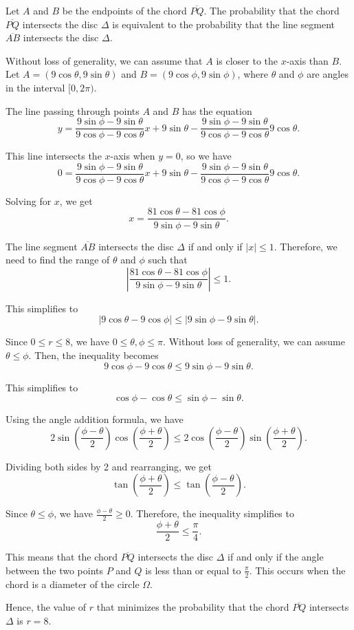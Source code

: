 Let $A$ and $B$ be the endpoints of the chord $\overline{PQ}$. The probability that the chord $\overline{PQ}$ intersects the disc $\Delta$ is equivalent to the probability that the line segment $\overline{AB}$ intersects the disc $\Delta$. 

Without loss of generality, we can assume that $A$ is closer to the $x$-axis than $B$. Let $A = (9\cos\theta, 9\sin\theta)$ and $B = (9\cos\phi, 9\sin\phi)$, where $\theta$ and $\phi$ are angles in the interval $[0, 2\pi)$.

The line passing through points $A$ and $B$ has the equation
$$y = \frac{9\sin\phi - 9\sin\theta}{9\cos\phi - 9\cos\theta}x + 9\sin\theta - \frac{9\sin\phi - 9\sin\theta}{9\cos\phi - 9\cos\theta}9\cos\theta.$$

This line intersects the $x$-axis when $y = 0$, so we have
$$0 = \frac{9\sin\phi - 9\sin\theta}{9\cos\phi - 9\cos\theta}x + 9\sin\theta - \frac{9\sin\phi - 9\sin\theta}{9\cos\phi - 9\cos\theta}9\cos\theta.$$

Solving for $x$, we get
$$x = \frac{81\cos\theta - 81\cos\phi}{9\sin\phi - 9\sin\theta}.$$

The line segment $\overline{AB}$ intersects the disc $\Delta$ if and only if $|x| \leq 1$. Therefore, we need to find the range of $\theta$ and $\phi$ such that
$$\left|\frac{81\cos\theta - 81\cos\phi}{9\sin\phi - 9\sin\theta}\right| \leq 1.$$

This simplifies to
$$|9\cos\theta - 9\cos\phi| \leq |9\sin\phi - 9\sin\theta|.$$

Since $0 \leq r \leq 8$, we have $0 \leq \theta, \phi \leq \pi$. Without loss of generality, we can assume $\theta \leq \phi$. Then, the inequality becomes
$$9\cos\phi - 9\cos\theta \leq 9\sin\phi - 9\sin\theta.$$

This simplifies to
$$\cos\phi - \cos\theta \leq \sin\phi - \sin\theta.$$

Using the angle addition formula, we have
$$2\sin\left(\frac{\phi - \theta}{2}\right)\cos\left(\frac{\phi + \theta}{2}\right) \leq 2\cos\left(\frac{\phi - \theta}{2}\right)\sin\left(\frac{\phi + \theta}{2}\right).$$

Dividing both sides by 2 and rearranging, we get
$$\tan\left(\frac{\phi + \theta}{2}\right) \leq \tan\left(\frac{\phi - \theta}{2}\right).$$

Since $\theta \leq \phi$, we have $\frac{\phi - \theta}{2} \geq 0$. Therefore, the inequality simplifies to
$$\frac{\phi + \theta}{2} \leq \frac{\pi}{4}.$$

This means that the chord $\overline{PQ}$ intersects the disc $\Delta$ if and only if the angle between the two points $P$ and $Q$ is less than or equal to $\frac{\pi}{2}$. This occurs when the chord is a diameter of the circle $\Omega$.

Hence, the value of $r$ that minimizes the probability that the chord $\overline{PQ}$ intersects $\Delta$ is $r = 8$.
